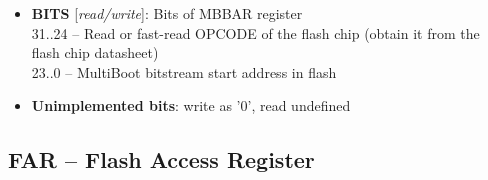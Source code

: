 \vspace{11pt}
\noindent
{}

\begin{itemize}
\item \begin{small}
{\bf 
BITS
} [\emph{read/write}]: Bits of MBBAR register
\\
31..24 -- Read or fast-read OPCODE of the flash chip (obtain it from the flash chip datasheet) \\                     23..0  -- MultiBoot bitstream start address in flash
\end{small}
\item \begin{small}
\textbf{Unimplemented bits}: write as '0', read undefined
\end{small}
\end{itemize}
\vspace{11pt}
\subsection{FAR -- Flash Access Register}
\label{app:memmap-far}

